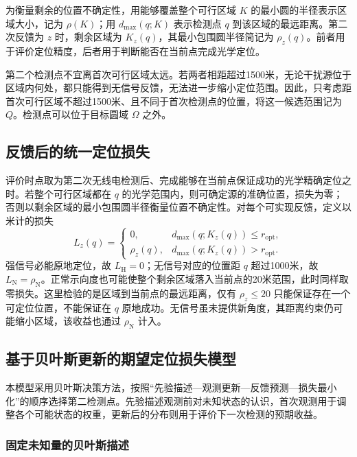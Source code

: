 \documentclass[UTF8,a4paper,zihao=-4,fontset=none]{ctexart}
\begin{document}
为衡量剩余的位置不确定性，用能够覆盖整个可行区域 \(K\) 的最小圆的半径表示区域大小，记为 \(\rho(K)\)；用 \(d_{\max}(q;K)\) 表示检测点 \(q\) 到该区域的最远距离。第二次反馈为 \(z\) 时，剩余区域为 \(K_z(q)\)，其最小包围圆半径简记为 \(\rho_z(q)\)。前者用于评价定位精度，后者用于判断能否在当前点完成光学定位。

第二个检测点不宜离首次可行区域太远。若两者相距超过1500米，无论干扰源位于区域内何处，都只能得到无信号反馈，无法进一步缩小定位范围。因此，只考虑距首次可行区域不超过1500米、且不同于首次检测点的位置，将这一候选范围记为 \(Q\)。检测点可以位于目标圆域 \(\Omega\) 之外。

\subsection{反馈后的统一定位损失}

评价时点取为第二次无线电检测后、完成能够在当前点保证成功的光学精确定位之时。若整个可行区域都在 \(q\) 的光学范围内，则可确定源的准确位置，损失为零；否则以剩余区域的最小包围圆半径衡量位置不确定性。对每个可实现反馈，定义以米计的损失
\begin{equation}
 L_z(q)=
 \begin{cases}
 0,&d_{\max}(q;K_z(q))\le r_{\mathrm{opt}},\\
 \rho_z(q),&d_{\max}(q;K_z(q))>r_{\mathrm{opt}}.
 \end{cases}
\label{eq:q2-pair-loss}
\end{equation}
强信号必能原地定位，故 \(L_{\mathrm H}=0\)；无信号对应的位置距 \(q\) 超过1000米，故 \(L_{\mathrm N}=\rho_{\mathrm N}\)。正常示向度也可能使整个剩余区域落入当前点的20米范围，此时同样取零损失。这里检验的是区域到当前点的最远距离，仅有 \(\rho_z\le20\) 只能保证存在一个可定位位置，不能保证在 \(q\) 原地成功。无信号虽未提供新角度，其距离约束仍可能缩小区域，该收益也通过 \(\rho_{\mathrm N}\) 计入。

\subsection{基于贝叶斯更新的期望定位损失模型}

本模型采用贝叶斯决策方法，按照“先验描述—观测更新—反馈预测—损失最小化”的顺序选择第二检测点。先验描述观测前对未知状态的认识，首次观测用于调整各个可能状态的权重，更新后的分布则用于评价下一次检测的预期收益。

\subsubsection{固定未知量的贝叶斯描述}
\end{document}
